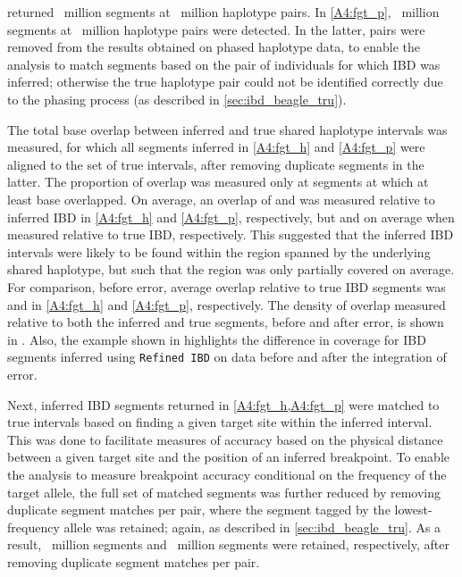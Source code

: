  returned ~million segments at ~million haplotype pairs.
In \cref{A4:fgt_p}, ~million segments at ~million haplotype pairs were detected.
In the latter,  pairs were removed from the results obtained on phased haplotype data, to enable the analysis to match segments based on the pair of individuals for which IBD was inferred; otherwise the true haplotype pair could not be identified correctly due to the phasing process (as described in \cref{sec:ibd_beagle_tru}).

%

%

The total base overlap between inferred and true shared haplotype intervals was measured, for which all segments inferred in \ref{A4:fgt_h} and \ref{A4:fgt_p} were aligned to the set of true intervals, after removing duplicate segments in the latter.
The proportion of overlap was measured only at segments at which at least  base overlapped.
On average, an overlap of  and  was measured relative to inferred IBD in \ref{A4:fgt_h} and \ref{A4:fgt_p}, respectively, but  and  on average when measured relative to true IBD, respectively.
This suggested that the inferred IBD intervals were likely to be found within the region spanned by the underlying shared haplotype, but such that the region was only partially covered on average.
For comparison, before error, average overlap relative to true IBD segments was  and  in \ref{A4:fgt_h} and \ref{A4:fgt_p}, respectively.
The density of overlap measured relative to both the inferred and true segments, before and after error, is shown in .
Also, the example shown in  highlights the difference in coverage for IBD segments inferred using \texttt{Refined\,IBD} on data before and after the integration of error.


Next, inferred IBD segments returned in \cref{A4:fgt_h,A4:fgt_p} were matched to true intervals based on finding a given target site within the inferred interval.
This was done to facilitate measures of accuracy based on the physical distance between a given target site and the position of an inferred breakpoint.
To enable the analysis to measure breakpoint accuracy conditional on the frequency of the target allele, the full set of matched segments was further reduced by removing duplicate segment matches per pair, where the segment tagged by the lowest-frequency allele was retained; again, as described in \cref{sec:ibd_beagle_tru}.
As a result, ~million segments and ~million segments were retained, respectively, after removing duplicate segment matches per pair.


